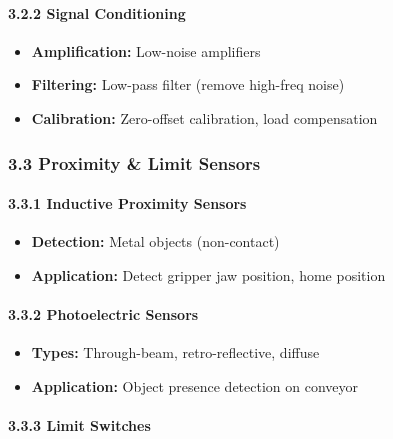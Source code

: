 \documentclass[
]{article}
\providecommand{\tightlist}{%
  \setlength{\itemsep}{0pt}\setlength{\parskip}{0pt}}
\begin{document}
\hypertarget{signal-conditioning}{%
\paragraph{3.2.2 Signal Conditioning}\label{signal-conditioning}}

\begin{itemize}
\tightlist
\item
  \textbf{Amplification:} Low-noise amplifiers
\item
  \textbf{Filtering:} Low-pass filter (remove high-freq noise)
\item
  \textbf{Calibration:} Zero-offset calibration, load compensation
\end{itemize}

\hypertarget{proximity-limit-sensors}{%
\subsubsection{3.3 Proximity \& Limit
Sensors}\label{proximity-limit-sensors}}

\hypertarget{inductive-proximity-sensors}{%
\paragraph{3.3.1 Inductive Proximity
Sensors}\label{inductive-proximity-sensors}}

\begin{itemize}
\tightlist
\item
  \textbf{Detection:} Metal objects (non-contact)
\item
  \textbf{Application:} Detect gripper jaw position, home position
\end{itemize}

\hypertarget{photoelectric-sensors}{%
\paragraph{3.3.2 Photoelectric Sensors}\label{photoelectric-sensors}}

\begin{itemize}
\tightlist
\item
  \textbf{Types:} Through-beam, retro-reflective, diffuse
\item
  \textbf{Application:} Object presence detection on conveyor
\end{itemize}

\hypertarget{limit-switches}{%
\paragraph{3.3.3 Limit Switches}\label{limit-switches}}
\end{document}
